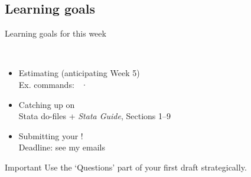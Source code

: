 \documentclass[t]{beamer}
\begin{document}

  \subsection{Learning goals}

 \begin{frame}[t]{Learning goals for this week}

   \\[1em]

	\begin{itemize}
		\item Estimating  (anticipating Week 5)\\[.5em]%
      Ex. commands:  · \\[.5em]%
		\item Catching up on \\[.5em]%
      Stata do-files + \emph{Stata Guide}, Sections 1--9\\[.5em]%
		\item Submitting your !\\[.5em]%
      Deadline: see my emails\\[.5em]%
	\end{itemize}

    \begin{alertblock}{Important}
       Use the `Questions' part of your first draft strategically.
    \end{alertblock}

  \end{frame}
\end{document}
